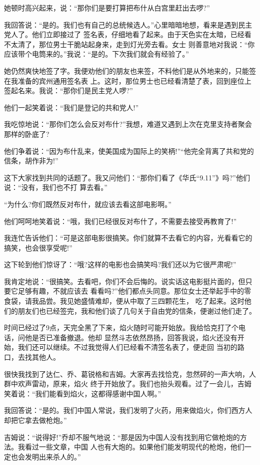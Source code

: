 ﻿\documentclass[11pt]{article}
\begin{document}
她顿时高兴起来，说：``那你们是要打算把布什从白宫里赶出去啰?''

我回答说：``是的。我们也有自己的总统候选人。''心里暗暗地想，看来是遇到民主党人了。他们立即接过了
签名表，仔细地看了起来。由于天色实在太暗，已经看不太清了，那位男士干脆站起身来，走到灯光旁去看。女士
则善意地对我说：``你应该带个电筒来的。''我说：``是的。下次我们就会有经验了。''

她仍然爽快地签了字。我便劝他们的朋友也来签，不料他们是从外地来的，只能签在我准备的宾州通用签名表
上。这时，那位男士也已经看清楚了表，回到座位上签起名来。我说：``那你们是民主党人啰?''

他们一起笑着说：``我们是登记的共和党人!''

我吃惊地说：``那你们怎么会反对布什?''我想，难道又遇到上次在克里支持者聚会那样的卧底了?

他们争着说：``因为布什乱来，使美国成为国际上的笑柄!''``他完全背离了共和党的信条，胡作非为!''

这下大家找到共同的话题了。我又问他们：``那你们看了《华氏``9.11''》吗?''他们说：``没有，我们也不打
算去看。''

``为什么?你们既然反对布什，就应该去看这部电影啊。''

他们呵呵地笑着说：``哦，我们已经很反对布什了，不需要去接受再教育了!''

我连忙告诉他们：``可是这部电影很搞笑。你们就算不去看它的内容，光看看它的搞笑，也会很享受呢!''

这下轮到他们惊讶了：``哦?这样的电影也会搞笑吗?我们还以为它很严肃呢!''

我肯定地说：``很搞笑。去看吧，你们不会后悔的。说实话这电影挺片面的，但只要它足够有趣，不就应该去
看看吗?''他们都点头同意。那位女士还举起手中的零食袋，请我品尝。我见她盛情难却，便从中取了三四颗花生，
吃了起来。这时他们的朋友们也已经签完，我和他们谈了几句关于自由党的信条，便谢过他们走了。

时间已经过了9点，天完全黑了下来，焰火随时可能开始放。我给恰克打了个电话，问他是否已准备撤退。他却
显然斗志依然昂扬，回答我说，焰火还没有开始，我们还可以继续。不过我觉得人们已经看不清签名表了，便走回
当初的路口，去找其他人。

很快我找到了达仁、乔、葛锐格和吉姆。大家再去找恰克，忽然砰的一声大响，人群中欢声雷动，原来，焰火
终于开始放了。我们也抬头观看。过了一会儿，吉姆笑着说：``我们能看到焰火，这都得感谢中国人啊。''

我回答说：``是的。我们中国人常说，我们发明了火药，用来做焰火，你们西方人却把它拿去做枪炮。''

吉姆说：``说得好!''乔却不服气地说：``那是因为中国人没有找到用它做枪炮的方法。我看过一些文章，中国
人也有大炮的。如果他们能发明现代的枪炮，他们一定也会发明出来杀人的。''
\end{document}
